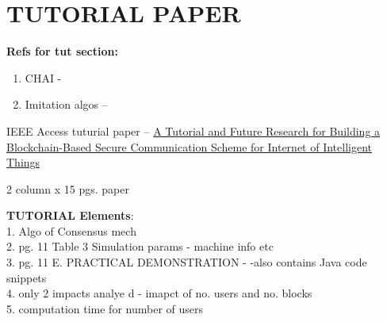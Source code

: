 \documentclass{article}
\begin{document}
\section{TUTORIAL PAPER}\label{sec:Tutorial}

\textbf{Refs for tut section:}
\begin{enumerate}
	\item CHAI - \cite{CHAI}
	\item Imitation algos -- \cite{imitation-algos}
\end{enumerate}
\par

IEEE Access tuturial paper -- \href{https://ieeexplore.ieee.org/document/9086464}{A Tutorial and Future Research for Building a Blockchain-Based Secure Communication Scheme for Internet of Intelligent Things} 

2 column x 15 pgs. paper

\textbf{TUTORIAL Elements}:\\
1. Algo of Consensus mech\\
2. pg. 11 Table 3 Simulation params - machine info etc\\
3. pg. 11 E. PRACTICAL DEMONSTRATION - -also contains Java code snippets\\
4. only 2 impacts analye d - imapct of no. users and no. blocks \\
5. computation time for number of users\\
\end{document}
